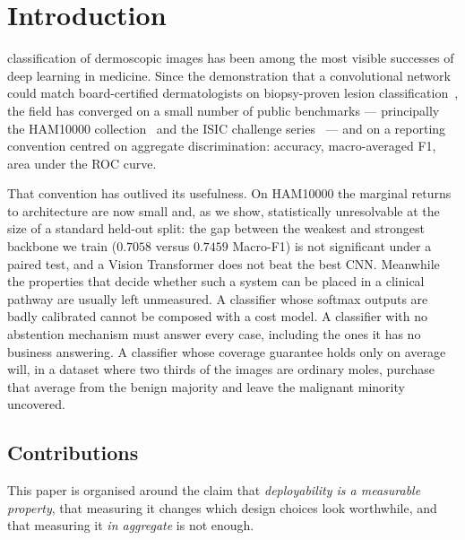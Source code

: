 \documentclass[journal]{IEEEtran}
\begin{document}
\section{Introduction}
 classification of dermoscopic images has been among the most
visible successes of deep learning in medicine. Since the demonstration that a convolutional
network could match board-certified dermatologists on biopsy-proven lesion
classification~\cite{esteva2017}, the field has converged on a small number of public
benchmarks --- principally the HAM10000 collection~\cite{tschandl2018ham10000} and the ISIC
challenge series~\cite{codella2018isic} --- and on a reporting convention centred on
aggregate discrimination: accuracy, macro-averaged F1, area under the ROC curve.

That convention has outlived its usefulness. On HAM10000 the marginal returns to
architecture are now small and, as we show, statistically unresolvable at the size of a
standard held-out split: the gap between the weakest and strongest backbone we train
($0.7058$ versus $0.7459$ Macro-F1) is not significant under a paired test, and a Vision
Transformer does not beat the best CNN. Meanwhile the properties that decide whether such a
system can be placed in a clinical pathway are usually left unmeasured. A classifier whose
softmax outputs are badly calibrated cannot be composed with a cost model. A classifier with
no abstention mechanism must answer every case, including the ones it has no business
answering. A classifier whose coverage guarantee holds only on average will, in a dataset
where two thirds of the images are ordinary moles, purchase that average from the benign
majority and leave the malignant minority uncovered.

\subsection{Contributions}
This paper is organised around the claim that \emph{deployability is a measurable property},
that measuring it changes which design choices look worthwhile, and that measuring it
\emph{in aggregate} is not enough.
\end{document}
